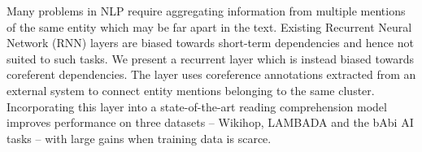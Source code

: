 Many problems in NLP require aggregating information from multiple mentions of the same entity which may be far apart in the text. Existing Recurrent Neural Network (RNN) layers are biased towards short-term dependencies and hence not suited to such tasks. We present a recurrent layer which is instead biased towards coreferent dependencies. The layer uses coreference annotations extracted from an external system to connect entity mentions belonging to the same cluster. Incorporating this layer into a state-of-the-art reading comprehension model improves performance on three datasets -- Wikihop, LAMBADA and the bAbi AI tasks -- with large gains when training data is scarce.
